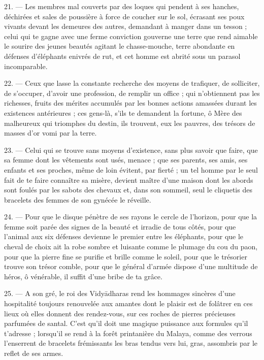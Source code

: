 \documentclass[a4paper, 11pt, oneside, french, landscape, twocolumn]{article}
\begin{document}
21. --- Les membres mal couverts par des loques qui pendent à ses hanches, déchirées et sales de poussière à force de coucher sur le sol, écrasant ses poux vivants devant les demeures des autres, demandant à manger dans un tesson ; celui qui te gagne avec une ferme conviction gouverne une terre que rend aimable le sourire des jeunes beautés agitant le chasse-mouche, terre abondante en défenses d'éléphants enivrés de rut, et cet homme est abrité sous un parasol incomparable.

22. --- Ceux que lasse la constante recherche des moyens de trafiquer, de solliciter, de s'occuper, d'avoir une profession, de remplir un office ; qui n'obtiennent pas les richesses, fruits des mérites accumulés par les bonnes actions amassées durant les existences antérieures ; ces gens-là, s'ils te demandent la fortune, ô Mère des malheureux qui triomphes du destin, ils trouvent, eux les pauvres, des trésors de masses d'or vomi par la terre.

23. --- Celui qui se trouve sans moyens d'existence, sans plus savoir que faire, que sa femme dont les vêtements sont usés, menace ; que ses parents, ses amis, ses enfants et ses proches, même de loin évitent, par fierté ; un tel homme par le seul fait de te faire connaître sa misère, devient maître d'une maison dont les abords sont foulés par les sabots des chevaux et, dans son sommeil, seul le cliquetis des bracelets des femmes de son gynécée le réveille.

24. --- Pour que le disque pénètre de ses rayons le cercle de l'horizon, pour que la femme soit parée des signes de la beauté et irradie de tous côtés, pour que l'animal aux six défenses devienne le premier entre les éléphants, pour que le cheval de choix ait la robe sombre et luisante comme le plumage du cou du paon, pour que la pierre fine se purifie et brille comme le soleil, pour que le trésorier trouve son trésor comble, pour que le général d'armée dispose d'une multitude de héros, ô vénérable, il suffit d'une bribe de ta grâce.

25. --- A son gré, le roi des Vidy\={a}dharas rend les hommages sincères d'une hospitalité toujours renouvelée aux amantes dont le plaisir est de folâtrer en ces lieux où elles donnent des rendez-vous, sur ces roches de pierres précieuses parfumées de santal. C'est qu'il doit une magique puissance aux formules qu'il t'adresse ; lorsqu'il se rend à la forêt printanière du Malaya, comme des verrous l'enserrent de bracelets frémissants les bras tendus vers lui, gras, assombris par le reflet de ses armes.
\end{document}

